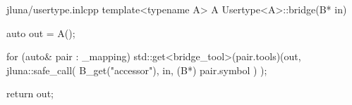 \begin{fileminted}{jluna/usertype.inl}{cpp}
template<typename A>
A Usertype<A>::bridge(B* in) {
    auto out = A();

    for (auto& pair : _mapping)
        std::get<bridge_tool>(pair.tools)(out, 
            jluna::safe_call(
                B_get("accessor"), in,             
                (B*) pair.symbol 
            )
        );
        
    return out;
}
\end{fileminted}